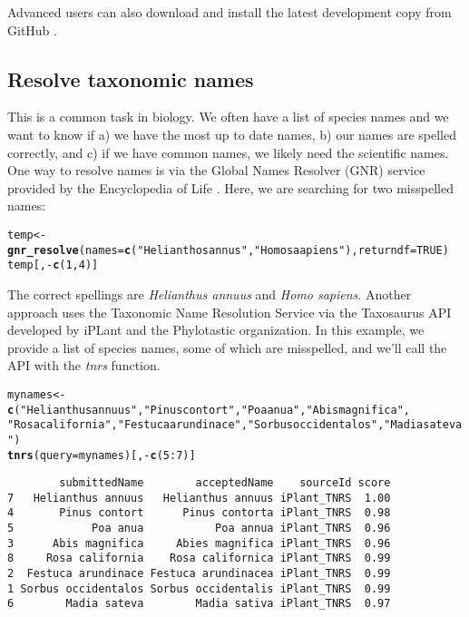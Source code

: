 \documentclass[10pt]{article}\usepackage[]{graphicx}\usepackage[]{color}
\makeatletter
\newcommand{\hlstr}[1]{\textcolor[rgb]{0.192,0.494,0.8}{#1}}%
\newcommand{\hlkwd}[1]{\textcolor[rgb]{0.737,0.353,0.396}{\textbf{#1}}}%
\newenvironment{kframe}{%
 \def\at@end@of@kframe{}%
 \ifinner\ifhmode%
  \def\at@end@of@kframe{\end{minipage}}%
  \begin{minipage}{\columnwidth}%
 \fi\fi%
 \def\FrameCommand##1{\hskip\@totalleftmargin \hskip-\fboxsep
 \colorbox{shadecolor}{##1}\hskip-\fboxsep
     \hskip-\linewidth \hskip-\@totalleftmargin \hskip\columnwidth}%
 \MakeFramed {\advance\hsize-\width
   \@totalleftmargin\z@ \linewidth\hsize
   \@setminipage}}%
 {\par\unskip\endMakeFramed%
 \at@end@of@kframe}
\newenvironment{knitrout}{}{} %
\makeatother
\begin{document}
Advanced users can also download and install the latest development copy from GitHub \cite{github_taxize}.

\subsection*{Resolve taxonomic names}

This is a common task in biology. We often have a list of species names and we want to know if a) we have the most up to date names, b) our names are spelled correctly, and c) if we have common names, we likely need the scientific names. One way to resolve names is via the Global Names Resolver (GNR) service provided by the Encyclopedia of Life \cite{eolgnr}. Here, we are searching for two misspelled names:

\begin{knitrout}
\color{fgcolor}\begin{kframe}
\begin{alltt}
temp <- \hlkwd{gnr_resolve}(names = \hlkwd{c}(\hlstr{"Helianthos annus"}, \hlstr{"Homo saapiens"}), returndf = TRUE)
temp[, -\hlkwd{c}(1, 4)]
\end{alltt}
\end{kframe}
\end{knitrout}


The correct spellings are \emph{Helianthus annuus} and \emph{Homo sapiens}. Another approach uses the Taxonomic Name Resolution Service via the Taxosaurus API \cite{taxosaurus} developed by iPLant and the Phylotastic organization. In this example, we provide a list of species names, some of which are misspelled, and we'll call the API with the \emph{tnrs} function.

\begin{knitrout}
\color{fgcolor}\begin{kframe}
\begin{alltt}
mynames <- \hlkwd{c}(\hlstr{"Helianthus annuus"}, \hlstr{"Pinus contort"}, \hlstr{"Poa anua"}, \hlstr{"Abis magnifica"}, 
    \hlstr{"Rosa california"}, \hlstr{"Festuca arundinace"}, \hlstr{"Sorbus occidentalos"}, \hlstr{"Madia sateva"})
\hlkwd{tnrs}(query = mynames)[, -\hlkwd{c}(5:7)]
\end{alltt}
\begin{verbatim}
        submittedName        acceptedName    sourceId score
7   Helianthus annuus   Helianthus annuus iPlant_TNRS  1.00
4       Pinus contort      Pinus contorta iPlant_TNRS  0.98
5            Poa anua           Poa annua iPlant_TNRS  0.96
3      Abis magnifica     Abies magnifica iPlant_TNRS  0.96
8     Rosa california    Rosa californica iPlant_TNRS  0.99
2  Festuca arundinace Festuca arundinacea iPlant_TNRS  0.99
1 Sorbus occidentalos Sorbus occidentalis iPlant_TNRS  0.99
6        Madia sateva        Madia sativa iPlant_TNRS  0.97
\end{verbatim}
\end{kframe}
\end{knitrout}
\end{document}
